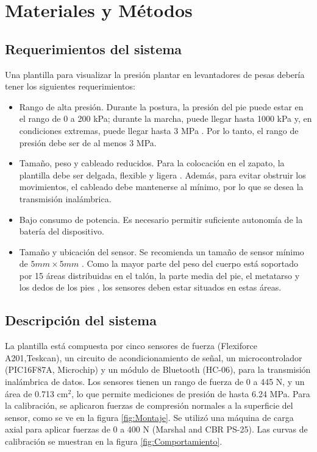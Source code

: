 \chapter{Materiales y Métodos} \label{sec:Metodos}

\section{Requerimientos del sistema}

Una plantilla para visualizar la presión plantar en levantadores de pesas debería tener los siguientes requerimientos:

\begin{itemize}
 
 \item Rango de alta presión. Durante la postura, la presión del pie puede estar en el rango de 0 a 200 kPa; durante la marcha, puede llegar hasta 1000 kPa y, en condiciones extremas, puede llegar hasta 3 MPa \cite{urry1999plantar}. Por lo tanto, el rango de presión debe ser de al menos 3 MPa.
 
 \item Tamaño, peso y cableado reducidos. Para la colocación en el zapato, la plantilla debe ser delgada, flexible y ligera \cite{abdul2012foot}. Además, para evitar obstruir los movimientos, el cableado debe mantenerse al mínimo, por lo que se desea la transmisión inalámbrica.
 
 \item Bajo consumo de potencia. Es necesario permitir suficiente autonomía de la batería del dispositivo.  
 
 \item Tamaño y ubicación del sensor. Se recomienda un tamaño de sensor mínimo de $5 mm \times 5 mm$ \cite{abdul2012foot}. Como la mayor parte del peso del cuerpo está soportado por 15 áreas distribuidas en el talón, la parte media del pie, el metatarso y los dedos de los pies \cite{shu2010shoe}, los sensores deben estar situados en estas áreas.
 
 \end{itemize} 

\section{Descripción del sistema}

La plantilla está compuesta por cinco sensores de fuerza (Flexiforce A201,Teskcan), un circuito de acondicionamiento de señal, un microcontrolador (PIC16F87A, Microchip) y un módulo de Bluetooth (HC-06), para la transmisión inalámbrica de datos. Los sensores tienen un rango de fuerza de 0 a 445 N, y un área de 0.713 cm$^{2}$, lo que permite mediciones de presión de hasta 6.24 MPa. Para la calibración, se aplicaron fuerzas de compresión normales a la superficie del sensor, como se ve en la figura \ref{fig:Montaje}. Se utilizó una máquina de carga axial para aplicar fuerzas de 0 a 400 N (Marshal and CBR PS-25). Las curvas de calibración se muestran en la figura \ref{fig:Comportamiento}.

